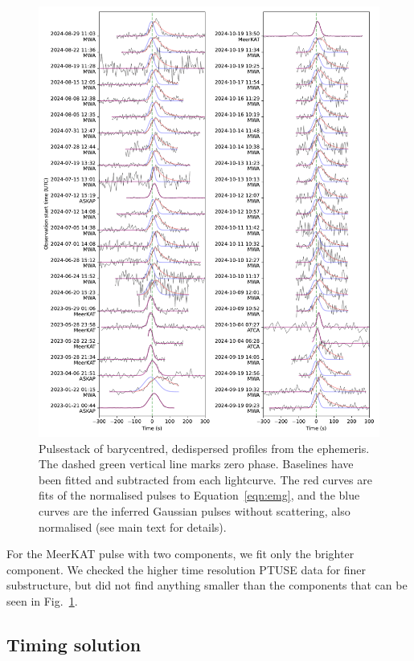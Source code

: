 \documentclass[fleqn,usenatbib]{mnras}
\newcommand{\Fig}{Fig.}
\newcommand{\Eqn}{Equation}
\begin{document}
\begin{figure}
      \centering
          \includegraphics[width=0.95\linewidth]{pulsestack.pdf}
              \caption{Pulsestack of barycentred, dedispersed profiles from the ephemeris. The dashed green vertical line marks zero phase. Baselines have been fitted and subtracted from each lightcurve. The red curves are fits of the normalised pulses to \Eqn~\ref{eqn:emg}, and the blue curves are the inferred Gaussian pulses without scattering, also normalised (see main text for details).}
                  \label{fig:pulsestack}
\end{figure}

For the MeerKAT pulse with two components, we fit only the brighter component.
We checked the higher time resolution PTUSE data for finer substructure, but did not find anything smaller than the components that can be seen in \Fig~\ref{fig:pulsestack}.

\subsection{Timing solution} \label{sec:timing}
\end{document}
